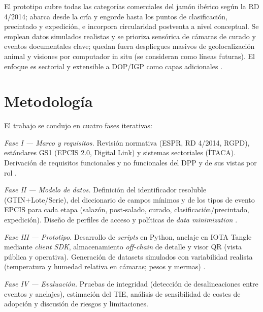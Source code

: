 El prototipo cubre todas las categorías comerciales del jamón ibérico según la RD 4/2014; abarca desde la cría y engorde hasta los puntos de clasificación, precintado y expedición, e incorpora circularidad postventa a nivel conceptual. Se emplean datos simulados realistas y se prioriza sensórica de cámaras de curado y eventos documentales clave; quedan fuera despliegues masivos de geolocalización animal y visiones por computador in situ (se consideran como líneas futuras). El enfoque es sectorial y extensible a DOP/IGP como capas adicionales \cite{}.

\section{Metodología}\label{sec:intro-metodologia}
El trabajo se condujo en cuatro fases iterativas:

\textit{Fase I — Marco y requisitos.} Revisión normativa (ESPR, RD 4/2014, RGPD), estándares GS1 (EPCIS 2.0, Digital Link) y sistemas sectoriales (ÍTACA). Derivación de requisitos funcionales y no funcionales del DPP y de sus vistas por rol \cite{}.

\textit{Fase II — Modelo de datos.} Definición del identificador resoluble (GTIN+Lote/Serie), del diccionario de campos mínimos y de los tipos de evento EPCIS para cada etapa (salazón, post-salado, curado, clasificación/precintado, expedición). Diseño de perfiles de acceso y políticas de \textit{data minimization} \cite{}.

\textit{Fase III — Prototipo.} Desarrollo de \textit{scripts} en Python, anclaje en IOTA Tangle mediante \textit{client SDK}, almacenamiento \textit{off-chain} de detalle y visor QR (vista pública y operativa). Generación de datasets simulados con variabilidad realista (temperatura y humedad relativa en cámaras; pesos y mermas) \cite{}.

\textit{Fase IV — Evaluación.} Pruebas de integridad (detección de desalineaciones entre eventos y anclajes), estimación del TIE, análisis de sensibilidad de costes de adopción y discusión de riesgos y limitaciones.

